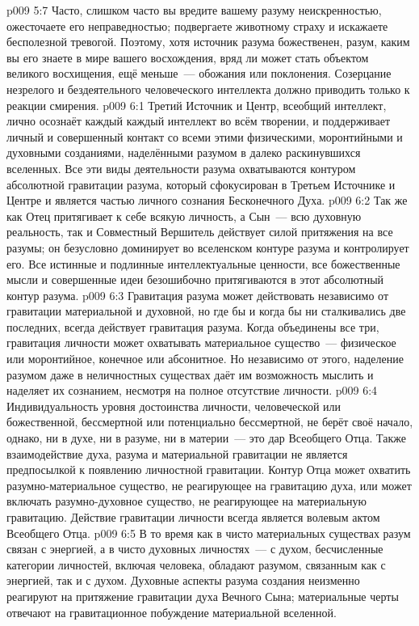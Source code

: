 \vs p009 5:7 Часто, слишком часто вы вредите вашему разуму неискренностью, ожесточаете его неправедностью; подвергаете животному страху и искажаете бесполезной тревогой. Поэтому, хотя источник разума божественен, разум, каким вы его знаете в мире вашего восхождения, вряд ли может стать объектом великого восхищения, ещё меньше~--- обожания или поклонения. Созерцание незрелого и бездеятельного человеческого интеллекта должно приводить только к реакции смирения.
\vs p009 6:1 Третий Источник и Центр, всеобщий интеллект, лично осознаёт каждый  каждый интеллект во всём творении, и поддерживает личный и совершенный контакт со всеми этими физическими, моронтийными и духовными созданиями, наделёнными разумом в далеко раскинувшихся вселенных. Все эти виды деятельности разума охватываются контуром абсолютной гравитации разума, который сфокусирован в Третьем Источнике и Центре и является частью личного сознания Бесконечного Духа.
\vs p009 6:2 Так же как Отец притягивает к себе всякую личность, а Сын~--- всю духовную реальность, так и Совместный Вершитель действует силой притяжения на все разумы; он безусловно доминирует во вселенском контуре разума и контролирует его. Все истинные и подлинные интеллектуальные ценности, все божественные мысли и совершенные идеи безошибочно притягиваются в этот абсолютный контур разума.
\vs p009 6:3 \pc Гравитация разума может действовать независимо от гравитации материальной и духовной, но где бы и когда бы ни сталкивались две последних, всегда действует гравитация разума. Когда объединены все три, гравитация личности может охватывать материальное существо~--- физическое или моронтийное, конечное или абсонитное. Но независимо от этого, наделение разумом даже в неличностных существах даёт им возможность мыслить и наделяет их сознанием, несмотря на полное отсутствие личности.
\vs p009 6:4 \pc Индивидуальность уровня достоинства личности, человеческой или божественной, бессмертной или потенциально бессмертной, не берёт своё начало, однако, ни в духе, ни в разуме, ни в материи~--- это дар Всеобщего Отца. Также взаимодействие духа, разума и материальной гравитации не является предпосылкой к появлению личностной гравитации. Контур Отца может охватить разумно\hyp{}материальное существо, не реагирующее на гравитацию духа, или может включать разумно\hyp{}духовное существо, не реагирующее на материальную гравитацию. Действие гравитации личности всегда является волевым актом Всеобщего Отца.
\vs p009 6:5 В то время как в чисто материальных существах разум связан с энергией, а в чисто духовных личностях~--- с духом, бесчисленные категории личностей, включая человека, обладают разумом, связанным как с энергией, так и с духом. Духовные аспекты разума создания неизменно реагируют на притяжение гравитации духа Вечного Сына; материальные черты отвечают на гравитационное побуждение материальной вселенной.
